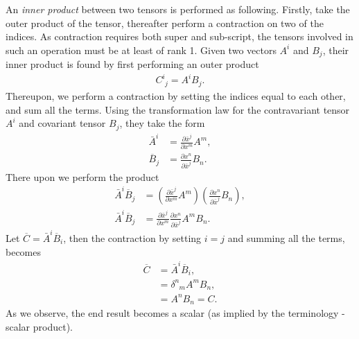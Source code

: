 \documentclass[main.tex]{subfiles}
\begin{document}
\begin{example}
An \emph{inner product} between two tensors is performed as following. Firstly, take the 
outer product of the tensor, thereafter perform a contraction on two of the indices. As 
contraction requires both super and sub-script, the tensors involved in such an operation 
must be at least of rank 1. Given two vectors $A^i$ and $B_j$, their inner product is found 
by first performing an outer product
\begin{align*}
C^i_{\phantom{i}j} = A^i B_j.
\end{align*}
Thereupon, we perform a contraction by setting the indices equal to each other, and sum all the
terms. Using the transformation law for the contravariant tensor $A^i$ and covariant tensor
$B_j$, they take the form
\begin{align*}
\bar{A}^i &= \frac{\partial \bar{x}^j}{\partial x^m} A^m,\\
\overline{B}_j &= \frac{\partial x^n}{\partial \bar{x}^j} B_n.
\end{align*}
There upon we perform the product
\begin{align*}
\bar{A}^i\overline{B}_j &= \left(\frac{\partial \bar{x}^j}{\partial x^m} A^m\right)
 \left(\frac{\partial x^n}{\partial \bar{x}^j} B_n\right), \\
 \bar{A}^i\overline{B}_j &=  \frac{\partial \bar{x}^j}{\partial x^m}
 							 \frac{\partial x^n}{\partial \bar{x}^j}
 							 A^m B_n.					  
\end{align*}
Let $\overline{C} = \bar{A}^i\overline{B}_i$, then the contraction by setting $i=j$ and
summing all the terms, becomes
\begin{align*}
\overline{C} &= \bar{A}^i\overline{B}_i,\\
			 &= \delta^n_{\phantom{n}m} A^m B_n,\\
			 &= A^n B_n	= C.
\end{align*}
As we observe, the end result becomes a scalar (as implied by the terminology - scalar product).
\end{example}


\end{document}
